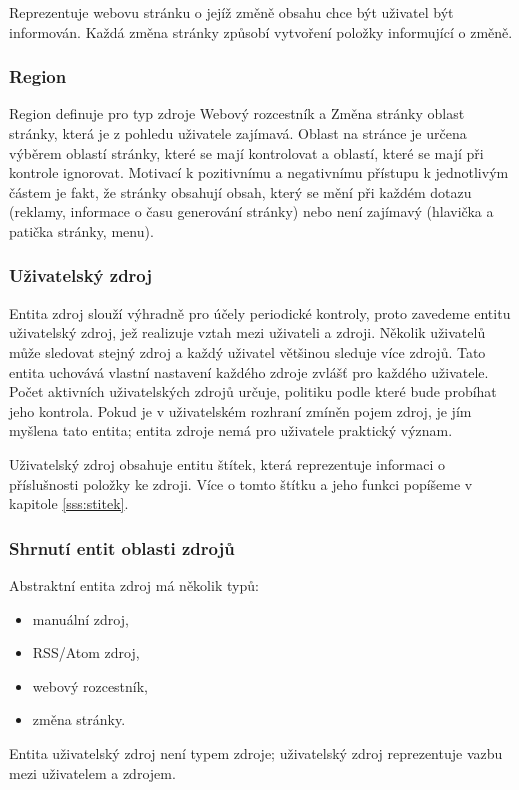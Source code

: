 Reprezentuje webovu stránku o jejíž změně obsahu chce být uživatel být informován.
Každá změna stránky způsobí vytvoření položky informující o změně.

\subsubsection{Region}

Region definuje pro typ zdroje Webový rozcestník a Změna stránky oblast stránky, která je z pohledu uživatele zajímavá.
Oblast na stránce je určena výběrem oblastí stránky, které se mají kontrolovat a oblastí, které se mají při kontrole ignorovat.
Motivací k pozitivnímu a negativnímu přístupu k jednotlivým částem je fakt, že stránky obsahují obsah, který se mění při každém dotazu (reklamy, informace o času generování stránky) nebo není zajímavý (hlavička a patička stránky, menu).

\subsubsection{Uživatelský zdroj}
\label{sss:uzivatelsky-zdroj}

Entita zdroj slouží výhradně pro účely periodické kontroly, proto zavedeme entitu uživatelský zdroj, jež realizuje vztah mezi uživateli a zdroji.
Několik uživatelů může sledovat stejný zdroj a každý uživatel většinou sleduje více zdrojů.
Tato entita uchovává vlastní nastavení každého zdroje zvlášť pro každého uživatele.
Počet aktivních uživatelských zdrojů určuje, politiku podle které bude probíhat jeho kontrola.
Pokud je v uživatelském rozhraní zmíněn pojem zdroj, je jím myšlena tato entita; entita zdroje nemá pro uživatele praktický význam.

Uživatelský zdroj obsahuje entitu štítek, která reprezentuje informaci o příslušnosti položky ke zdroji.
Více o tomto štítku a jeho funkci popíšeme v kapitole \ref{sss:stitek}.

\subsubsection{Shrnutí entit oblasti zdrojů}
\label{sss:shrnuti-zdroju}
Abstraktní entita zdroj má několik typů:
\begin{itemize}
	\item manuální zdroj,
	\item RSS/Atom zdroj,
	\item webový rozcestník,
	\item změna stránky.
\end{itemize}
Entita uživatelský zdroj není typem zdroje; uživatelský zdroj reprezentuje vazbu mezi uživatelem a zdrojem.

